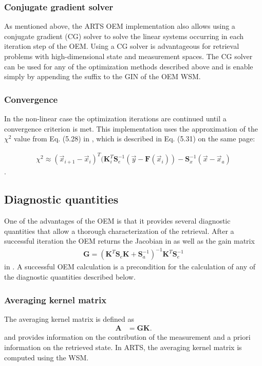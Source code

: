 \subsubsection{Conjugate gradient solver}
\label{sec:oem:cg}
As mentioned above, the ARTS OEM implementation also allows using a conjugate
gradient (CG) solver to solve the linear systems occurring in each iteration
 step of the OEM. Using a CG solver is advantageous for retrieval problems
 with high-dimensional state and measurement spaces. The CG solver can be used
 for any of the optimization methods described above and is enable simply
 by appending the  suffix to the  GIN of
 the OEM WSM.

\subsubsection{Convergence}

In the non-linear case the optimization iterations are continued until 
a convergence criterion is met. This implementation uses the approximation
of the $\chi^2$ value from  Eq. (5.28) in \citet{rodgers:00}, which is
 described in Eq. (5.31) on the same page:

\begin{eqnarray}
\chi^2 \approx (\vec{x}_{i + 1} - \vec{x}_i)^T 
(\mathbf{K}_i^T \mathbf{S}_e^{-1} (\vec{y} - \mathbf{F}(\vec{x}_i))
 - \mathbf{S}_x^{-1}(\vec{x} - \vec{x}_a)
\end{eqnarray}
.

\subsection{Diagnostic quantities}

One of the advantages of the OEM is that it provides several diagnostic
quantities that allow a thorough characterization of the retrieval. After
a successful iteration the OEM returns the Jacobian in
 as well as the  gain matrix 
%
\begin{eqnarray}
\mathbf{G} = (\mathbf{K}^T \mathbf{S}_e\mathbf{K} + \mathbf{S}_a^{-1})^{-1}
\mathbf{K}^T\mathbf{S}_e^{-1}
\end{eqnarray}
%
in . A successful OEM calculation is a precondition for
the calculation of any of the diagnostic quantities described below.

\subsubsection{Averaging kernel matrix}
The averaging kernel matrix is defined as
%
\begin{eqnarray}
\mathbf{A} &= \mathbf{G}\mathbf{K}.
\end{eqnarray}
%
and provides information on the contribution of the measurement and 
a priori information on the retrieved state.  In ARTS, the averaging
kernel matrix is computed using the  WSM.

